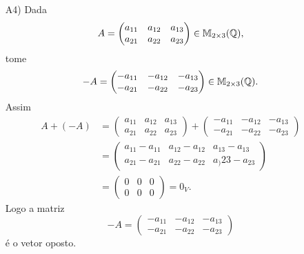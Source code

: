 \begin{exemplo}
\begin{enumerate}[label={\arabic*})]
\begin{solucao}
\begin{itemize}
              \item[A4)] Dada
                \[
                  A = \begin{pmatrix} a_{11} & a_{12} & a_{13}\\a_{21} & a_{22} & a_{23}\end{pmatrix} \in \mathbb{M}_{2 \times 3}(\mathbb{Q}),
                \]
                tome
                \[
                  -A = \begin{pmatrix} -a_{11} & -a_{12} & -a_{13}\\-a_{21} & -a_{22} & -a_{23}\end{pmatrix} \in \mathbb{M}_{2 \times 3}(\mathbb{Q}).
                \]
                Assim
                \begin{align*}
                  A + (-A) & = \begin{pmatrix} a_{11} & a_{12} & a_{13}\\a_{21} & a_{22} & a_{23}\end{pmatrix} +
                  \begin{pmatrix} -a_{11} & -a_{12} & -a_{13}\\-a_{21} & -a_{22} & -a_{23}\end{pmatrix}
                  \\ &= \begin{pmatrix} a_{11} - a_{11} & a_{12} - a_{12} & a_{13} - a_{13}\\a_{21} - a_{21} & a_{22} - a_{22} & a_){23} - a_{23}\end{pmatrix}
                  \\ &= \begin{pmatrix}0 & 0 & 0\\0 & 0 & 0\end{pmatrix} = 0_V.
                \end{align*}
                Logo a matriz
                \[
                  -A = \begin{pmatrix} -a_{11} & -a_{12} & -a_{13}\\-a_{21} & -a_{22} & -a_{23}\end{pmatrix}
                \]
                é o vetor oposto.


\end{itemize}
\end{solucao}
\end{enumerate}
\end{exemplo}

